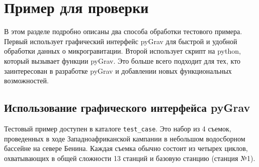 \chapter[Пример для проверки]{Пример для проверки}
\label{chap:test-case}

В этом разделе подробно описаны два способа обработки тестового примера. Первый
использует графический интерфейс pyGrav для быстрой и удобной обработки данных о
микрогравитации. Второй использует скрипт на python, который вызывает функции
pyGrav. Это больше всего подходит для тех, кто заинтересован в разработке pyGrav
и добавлении новых функциональных возможностей.

\section[Использование графического интерфейса pyGrav]{Использование графического интерфейса pyGrav}
\label{sec:using_pygrav_gui}

Тестовый пример доступен в каталоге \verb|test_case|. Это набор из 4 съемок,
проведенных в ходе Западноафриканской кампании в небольшом водосборном бассейне
на севере Бенина. Каждая съемка обычно состоит из четырех циклов, охватывающих в
общей сложности 13 станций и базовую станцию (станция №1). 

